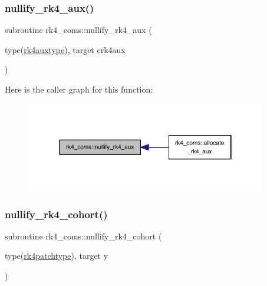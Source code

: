 \subsubsection{\texorpdfstring{nullify\+\_\+rk4\+\_\+aux()}{nullify\_rk4\_aux()}}
{\footnotesize\ttfamily subroutine rk4\+\_\+coms\+::nullify\+\_\+rk4\+\_\+aux (\begin{DoxyParamCaption}\item[{type(\hyperlink{structrk4__coms_1_1rk4auxtype}{rk4auxtype}), target}]{crk4aux }\end{DoxyParamCaption})}

Here is the caller graph for this function\+:
\nopagebreak
\begin{figure}[H]
\begin{center}
\leavevmode
\includegraphics[width=298pt]{namespacerk4__coms_a306ba21ba388b2e51767aa9f5d76eda0_icgraph}
\end{center}
\end{figure}
\mbox{\label{namespacerk4__coms_afe54efd0ad9ab38983314ca0d2557e26}} 
\subsubsection{\texorpdfstring{nullify\+\_\+rk4\+\_\+cohort()}{nullify\_rk4\_cohort()}}
{\footnotesize\ttfamily subroutine rk4\+\_\+coms\+::nullify\+\_\+rk4\+\_\+cohort (\begin{DoxyParamCaption}\item[{type(\hyperlink{structrk4__coms_1_1rk4patchtype}{rk4patchtype}), target}]{y }\end{DoxyParamCaption})}

